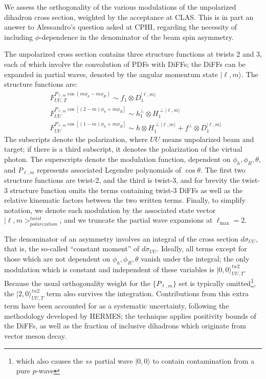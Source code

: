 \documentclass[12pt]{article}
\begin{document}
We assess the orthogonality of the various modulations of the unpolarized
dihadron cross section, weighted by the acceptance at CLAS. This is in part an
answer to Alessandro's question asked at CPHI, regarding the necessity of including
$\phi$-dependence in the denominator of the beam spin asymmetry.

The unpolarized
cross section contains three structure functions at twists 2 and 3, each of
which involve the convolution of PDFs with DiFFs; the DiFFs can be expanded in
partial waves, denoted by the angular momentum state $|\ell,m\rangle$. The
structure functions are:
\begin{align}
&F_{UU,T}^{P_{\ell,m}\cos\left(m\phi_h-m\phi_R\right)}
  \sim f_1\otimes D_1^{|\ell,m\rangle}\\
&F_{UU}^{P_{\ell,m}\cos\left[(2-m)\phi_h+m\phi_R\right]}
  \sim h_1^{\perp}\otimes H_1^{\perp|\ell,m\rangle}\\
&F_{UU}^{P_{\ell,m}\cos\left[(1-m)\phi_h+m\phi_R\right]}
  \sim h\otimes H_1^{\perp|\ell,m\rangle}+
       f^{\perp}\otimes D_1^{|\ell,m\rangle}
\end{align}
The subscripts denote the polarization, where $UU$ means unpolarized beam and
target; if there is a third subscript, it denotes the polarization of the
virtual photon. The superscripts denote the modulation function, dependent on
$\phi_h,\phi_R,\theta$, and $P_{\ell,m}$ represents associated Legendre
polynomials of $\cos\theta$. The first two structure functions are twist-2, and
the third is twist-3, and for brevity the twist-3 structure function omits the
terms containing twist-3 DiFFs as well as the relative kinematic factors between
the two written terms. Finally, to simplify notation, we denote each modulation
by the associated state vector $|\ell,m>_{polarization}^{twist}$, and we
truncate the partial wave expansions at $\ell_{\text{max}}=2$.

The denominator of an asymmetry involves an integral of the cross section
$d\sigma_{UU}$, that is, the so-called ``constant moment'' of $d\sigma_{UU}$.
Ideally, all terms except for those which are not dependent on
$\phi_h,\phi_R,\theta$ vanish under the integral; the only modulation which is
constant and independent of these variables is $|0,0\rangle_{UU,T}^{tw2}$. Because the
usual orthogonality weight for the $\{P_{\ell,m}\}$ set is typically
omitted\footnote{which also causes the $ss$ partial wave $|0,0\rangle$ to contain
contamination from a pure $p$-wave}, the $|2,0\rangle_{UU,T}^{tw2}$ term also
survives the integration. Contributions from this extra term have been accounted
for as a systematic uncertainty, following the methodology developed by HERMES;
the technique applies positivity bounds of the DiFFs, as well as the fraction of
inclusive dihadrons which originate from vector meson decay.
\end{document}
